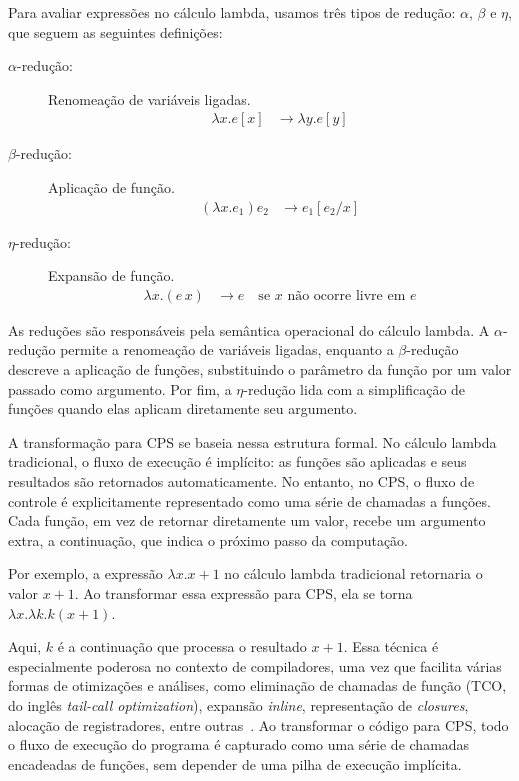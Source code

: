 Para avaliar expressões no cálculo lambda, usamos três tipos de redução: $\alpha$, $\beta$ e $\eta$, que seguem as seguintes definições:

\begin{description}
  \item[$\alpha$-redução:] Renomeação de variáveis ligadas.
        \begin{align}
          \lambda x . e[x] & \rightarrow \lambda y . e[y]\label{eq:alpha-reduction}
        \end{align}

  \item[$\beta$-redução:] Aplicação de função.
        \begin{align}
          (\lambda x . e_1) e_2 & \rightarrow e_1 [e_2 / x]\label{eq:beta-reduction}
        \end{align}

  \item[$\eta$-redução:] Expansão de função.
        \begin{align}
          \lambda x . (e \, x) & \rightarrow e \quad \text{se } x \text{ não ocorre livre em } e\label{eq:eta-reduction}
        \end{align}
\end{description}

As reduções são responsáveis pela semântica operacional do cálculo lambda.
A $\alpha$-redução permite a renomeação de variáveis ligadas, enquanto a $\beta$-redução descreve a aplicação de funções, substituindo o parâmetro da função por um valor passado como argumento.
Por fim, a $\eta$-redução lida com a simplificação de funções quando elas aplicam diretamente seu argumento.

A transformação para CPS se baseia nessa estrutura formal.
No cálculo lambda tradicional, o fluxo de execução é implícito: as funções são aplicadas e seus resultados são retornados automaticamente.
No entanto, no CPS, o fluxo de controle é explicitamente representado como uma série de chamadas a funções.
Cada função, em vez de retornar diretamente um valor, recebe um argumento extra, a continuação, que indica o próximo passo da computação.

Por exemplo, a expressão $\lambda x. x + 1$ no cálculo lambda tradicional retornaria o valor $x + 1$. Ao transformar essa expressão para CPS, ela se torna $\lambda x. \lambda k. k (x + 1)$.

Aqui, $k$ é a continuação que processa o resultado $x + 1$.
Essa técnica é especialmente poderosa no contexto de compiladores, uma vez que facilita várias formas de otimizações e análises, como eliminação de chamadas de função (TCO, do inglês \textit{tail-call optimization}), expansão \textit{inline}, representação de \textit{closures}, alocação de registradores, entre outras~\cite{appel1992compiling}.
Ao transformar o código para CPS, todo o fluxo de execução do programa é capturado como uma série de chamadas encadeadas de funções, sem depender de uma pilha de execução implícita.

